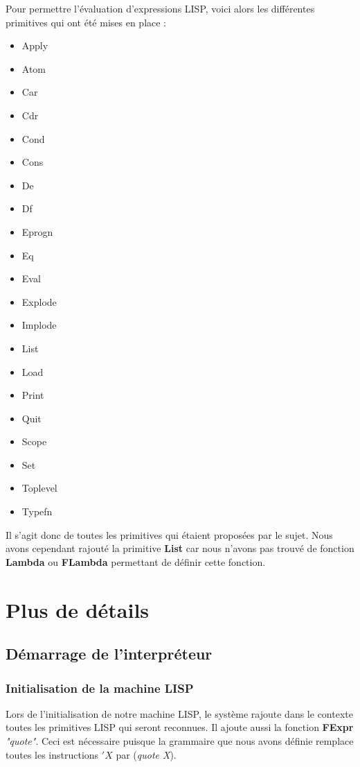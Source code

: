 \documentclass[a4paper, 11pt]{article}
\numberwithin{equation}{section}
\theoremstyle{definition}
\begin{document}
Pour permettre l'évaluation d'expressions LISP, voici alors les différentes primitives qui ont été mises en place :
\begin{multicols}{2}
	\begin{itemize}
		\item Apply
		\item Atom
		\item Car
		\item Cdr
		\item Cond
		\item Cons
		\item De
		\item Df
		\item Eprogn
		\item Eq
		\item Eval
		\item Explode
		\item Implode
		\item List
		\item Load
		\item Print
		\item Quit
		\item Scope
		\item Set
		\item Toplevel
		\item Typefn
	\end{itemize}
\end{multicols}
\vspace{3 mm}

Il s'agit donc de toutes les primitives qui étaient proposées par le sujet. Nous avons cependant rajouté la primitive {\bfseries List} car nous n'avons pas trouvé de fonction {\bfseries Lambda} ou {\bfseries FLambda} permettant de définir cette fonction.

\section{Plus de détails}

\subsection{Démarrage de l'interpréteur}

\subsubsection{Initialisation de la machine LISP}

Lors de l'initialisation de notre machine LISP, le système rajoute dans le contexte toutes les primitives LISP qui seront reconnues. Il ajoute aussi la fonction {\bfseries FExpr} \textit{"quote"}. Ceci est nécessaire puisque la grammaire que nous avons définie remplace toutes les instructions $'X$ par (\textit{quote X}).%
\end{document}
